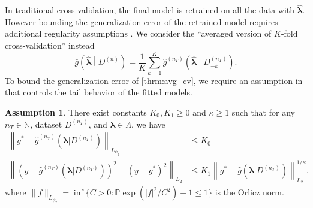 \documentclass[12pt]{article} %
\theoremstyle{definition}
\newtheorem{assump}{Assumption}
\begin{document}
In traditional cross-validation, the final model is retrained on all the data with $\hat{\boldsymbol{\lambda}}$. However bounding the generalization error of the retrained model requires additional regularity assumptions \citep{lecue2012oracle}. We consider the ``averaged version of $K$-fold cross-validation'' instead
\begin{equation}
\label{thrm:avg_cv}
\bar{g}\left ( \hat{\boldsymbol \lambda} \middle | {D^{(n)}} \right ) = 
\frac{1}{K} \sum_{k=1}^K 
\hat{g}^{(n_T)} \left (\hat{\boldsymbol \lambda} \middle | D^{(n_T)}_{-k} \right ).
\end{equation}
To bound the generalization error of \eqref{thrm:avg_cv}, we require an assumption in \citet{lecue2012oracle} that controls the tail behavior of the fitted models.
\begin{assump}
	\label{assump:tail_margin}
	There exist constants $K_0, K_1 \ge 0$ and $\kappa \ge 1$ such that for any $n_T \in \mathbb{N}$, dataset $D^{(n_T)}$, and $\boldsymbol{\lambda} \in \Lambda$, we have
	\begin{align}
	\left \|
	g^*
	- \hat{g}^{(n_T)}(\boldsymbol{\lambda} | D^{(n_T)})
	\right \|_{L_{\psi_2}} & \le K_0
	\label{eq:cv_assump1}\\
	\left \|
	\left(
	y - \hat{g}^{(n_T)}(\boldsymbol{\lambda} | D^{(n_T)})
	\right)^2
	- \left(
	y - g^*
	\right)^2
	\right \|_{L_2}
	& \le 
	K_1 \left \|
	g^{*}-\hat{g}(\boldsymbol{\lambda}|D^{(n_{T})})
	\right \|_{L_{2}}^{1/\kappa}.
	\label{eq:cv_assump2}
	\end{align}
	where $\|f\|_{L_{\psi_2}}= \inf \{C > 0: \mathbb{P}\exp(|f|^2/C^2) - 1 \le 1\}$ is the Orlicz norm.
\end{assump}
\end{document}
